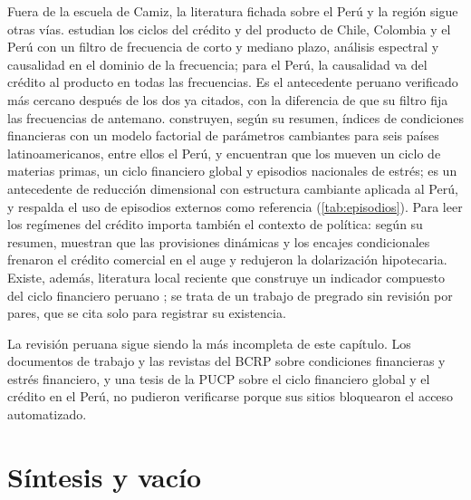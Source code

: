 Fuera de la escuela de Camiz, la literatura fichada sobre el Perú y la región sigue otras vías.
\textcite{gomez_gonzalez_et_al_2013} estudian los ciclos del crédito y
del producto de Chile, Colombia y el Perú con un filtro de frecuencia de corto y mediano plazo,
análisis espectral y causalidad en el dominio de la frecuencia; para el Perú, la causalidad va del
crédito al producto en todas las frecuencias. Es el antecedente peruano verificado más cercano
después de los dos ya citados, con la diferencia de que su filtro fija las frecuencias de
antemano. \textcite{brandao_marques_perez_ruiz_2017} construyen, según su resumen, índices de condiciones
financieras con un modelo factorial de parámetros cambiantes para seis países latinoamericanos,
entre ellos el Perú, y encuentran que los mueven un ciclo de materias primas, un ciclo financiero
global y episodios nacionales de estrés; es un antecedente de reducción dimensional con estructura
cambiante aplicada al Perú, y respalda el uso de episodios externos como referencia
(\cref{tab:episodios}). Para leer los regímenes del crédito importa también el contexto de
política: según su resumen, \textcite{minaya_lupu_cabello_2017} muestran que las provisiones
dinámicas y los encajes condicionales frenaron el crédito comercial en el auge y redujeron la
dolarización hipotecaria. Existe, además, literatura local reciente que construye un indicador
compuesto del ciclo financiero peruano \parencite{alvarado_vargas_2021}; se trata de un trabajo de
pregrado sin revisión por pares, que se cita solo para registrar su existencia.

La revisión peruana sigue siendo la más incompleta de este capítulo. Los documentos de trabajo y
las revistas del BCRP sobre condiciones financieras y estrés financiero, y una tesis de la PUCP
sobre el ciclo financiero global y el crédito en el Perú, no pudieron verificarse porque sus sitios
bloquearon el acceso automatizado.

\section{Síntesis y vacío}
\label{sec:vacios}

